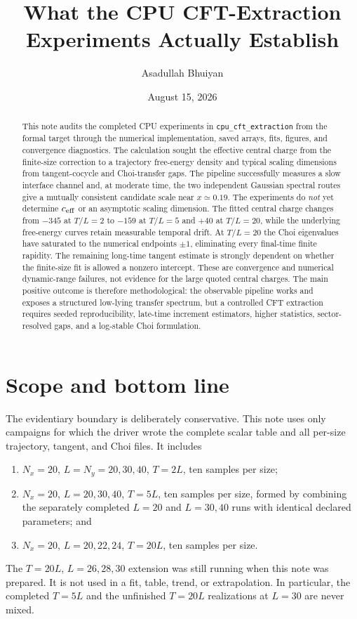 \documentclass[aps,prb,onecolumn,nofootinbib,superscriptaddress]{revtex4-2}
\begin{document}
\title{What the CPU CFT-Extraction Experiments Actually Establish}
\author{Asadullah Bhuiyan}
\noaffiliation
\date{August 15, 2026}

\begin{abstract}
This note audits the completed CPU experiments in \texttt{cpu\_cft\_extraction} from the
formal target through the numerical implementation, saved arrays, fits, figures, and
convergence diagnostics.  The calculation sought the effective central charge from the
finite-size correction to a trajectory free-energy density and typical scaling dimensions
from tangent-cocycle and Choi-transfer gaps.  The pipeline successfully measures a slow
interface channel and, at moderate time, the two independent Gaussian spectral routes give
a mutually consistent candidate scale near $x\simeq0.19$.  The experiments do \emph{not}
yet determine $c_{\rm eff}$ or an asymptotic scaling dimension.  The fitted central charge
changes from $-345$ at $T/L=2$ to $-159$ at $T/L=5$ and $+40$ at $T/L=20$, while the
underlying free-energy curves retain measurable temporal drift.  At $T/L=20$ the Choi
eigenvalues have saturated to the numerical endpoints $\pm1$, eliminating every final-time
finite rapidity.  The remaining long-time tangent estimate is strongly dependent on whether
the finite-size fit is allowed a nonzero intercept.  These are convergence and numerical
dynamic-range failures, not evidence for the large quoted central charges.  The main
positive outcome is therefore methodological: the observable pipeline works and exposes a
structured low-lying transfer spectrum, but a controlled CFT extraction requires seeded
reproducibility, late-time increment estimators, higher statistics, sector-resolved gaps,
and a log-stable Choi formulation.
\end{abstract}

\maketitle
\setcounter{tocdepth}{2}
\tableofcontents

\section{Scope and bottom line}

The evidentiary boundary is deliberately conservative.  This note uses only campaigns for
which the driver wrote the complete scalar table and all per-size trajectory, tangent, and
Choi files.  It includes
\begin{enumerate}
\item $N_x=20$, $L=N_y=20,30,40$, $T=2L$, ten samples per size;
\item $N_x=20$, $L=20,30,40$, $T=5L$, ten samples per size, formed by combining the
separately completed $L=20$ and $L=30,40$ runs with identical declared parameters; and
\item $N_x=20$, $L=20,22,24$, $T=20L$, ten samples per size.
\end{enumerate}
The $T=20L$, $L=26,28,30$ extension was still running when this note was prepared.  It is
not used in a fit, table, trend, or extrapolation.  In particular, the completed $T=5L$ and
the unfinished $T=20L$ realizations at $L=30$ are never mixed.
\end{document}
